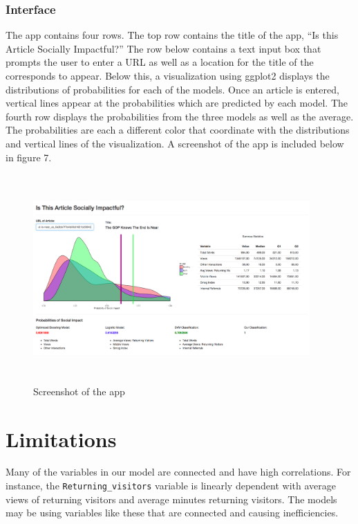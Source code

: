 \documentclass[10pt,letterpaper]{article}
\begin{document}
\hypertarget{interface}{%
\subsubsection{Interface}\label{interface}}

The app contains four rows. The top row contains the title of the app,
``Is this Article Socially Impactful?'' The row below contains a text
input box that prompts the user to enter a URL as well as a location for
the title of the corresponds to appear. Below this, a visualization
using ggplot2 displays the distributions of probabilities for each of
the models. Once an article is entered, vertical lines appear at the
probabilities which are predicted by each model. The fourth row displays
the probabilities from the three models as well as the average. The
probabilities are each a different color that coordinate with the
distributions and vertical lines of the visualization. A screenshot of
the app is included below in figure 7.

\begin{figure}
\includegraphics[width=400px,height=300px]{app} \caption{Screenshot of the app}\label{fig:unnamed-chunk-9}
\end{figure}

\hypertarget{limitations}{%
\section{Limitations}\label{limitations}}

Many of the variables in our model are connected and have high
correlations. For instance, the \texttt{Returning\_visitors} variable is
linearly dependent with average views of returning visitors and average
minutes returning visitors. The models may be using variables like these
that are connected and causing inefficiencies.
\end{document}
